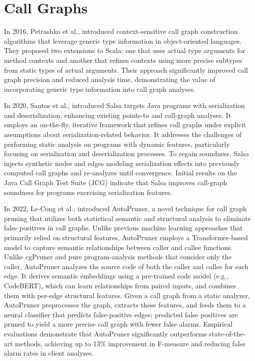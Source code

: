 \section{Call Graphs}
In 2016, Petrashko et al., introduced context-sensitive call graph construction algorithms that leverage generic type information in object-oriented languages. 
They proposed two extensions to Scala: one that uses actual type arguments for method contexts and another that refines contexts using more precise subtypes from static types of actual arguments. Their approach significantly improved call graph precision and reduced analysis time, demonstrating the value of incorporating generic type information into call graph analyses.

In 2020, Santos et al., introduced Salsa targets Java programs with serialization and deserialization, enhancing existing points-to and call-graph analyses. It employs an on-the-fly, iterative framework that refines call graphs under explicit assumptions about serialization-related behavior. It addresses the challenges of performing static analysis on programs with dynamic features, particularly focusing on serialization and deserialization processes. To regain soundness, Salsa injects synthetic nodes and edges modeling serialization effects into previously computed call graphs and re-analyzes until convergence. Initial results on the Java Call Graph Test Suite (JCG) indicate that Salsa improves call-graph soundness for programs exercising serialization features.

In 2022, Le-Cong et al., introduced AutoPruner, a novel technique for call graph pruning that utilizes both statistical semantic and structural analysis to eliminate false positives in call graphs. Unlike previous machine learning approaches that primarily relied on structural features, AutoPruner employs a Transformer-based model to capture semantic relationships between caller and callee functions. Unlike cgPruner and pure program-analysis methods that consider only the caller, AutoPruner analyzes the source code of both the caller and callee for each edge. It derives semantic embeddings using a pre-trained code model (e.g., CodeBERT), which can learn relationships from paired inputs, and combines them with per-edge structural features. Given a call graph from a static analyzer, AutoPruner preprocesses the graph, extracts these features, and feeds them to a neural classifier that predicts false-positive edges; predicted false positives are pruned to yield a more precise call graph with fewer false alarms.
Empirical evaluations demonstrate that AutoPruner significantly outperforms state-of-the-art methods, achieving up to 13\% improvement in F-measure and reducing false alarm rates in client analyses.

